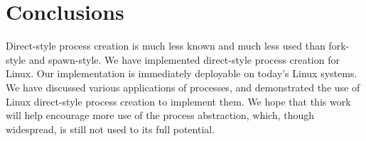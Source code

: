 \documentclass[sigplan]{acmart}
\begin{document}
\section{Conclusions}\label{conclusions}
Direct-style process creation is much less known and much less used than fork-style and spawn-style.
We have implemented direct-style process creation for Linux.
Our implementation is immediately deployable on today's Linux systems.
We have discussed various applications of processes,
and demonstrated the use of Linux direct-style process creation
to implement them.
We hope that this work will help encourage more use of the process abstraction,
which, though widespread,
is still not used to its full potential.



\end{document}
